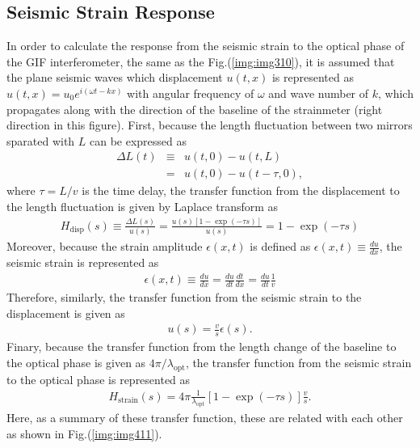 \subsection{Seismic Strain Response}
In order to calculate the response from the seismic strain to the optical phase of the GIF interferometer, the same as the Fig.(\ref{img:img310}), it is assumed that the plane seismic waves which displacement $u(t,x)$ is represented as $u(t,x)=u_0e^{i(\omega{t}-kx)}$ with angular frequency of $\omega$ and wave number of $k$, which propagates along with the direction of the baseline of the strainmeter (right direction in this figure). First, because the length fluctuation between two mirrors sparated with $L$ can be expressed as 
\begin{eqnarray} 
  \Delta{L(t)} &\equiv& u(t,0) - u(t,L) \\
  &=& u(t,0) - u(t-\tau,0), \label{eq:eq403}
\end{eqnarray}
where $\tau=L/v$ is the time delay, the transfer function from the displacement to the length fluctuation is given by Laplace transform as
\begin{eqnarray} \label{eq:eq404}
  H_{\mathrm{disp}}(s) \equiv \frac{\Delta{L(s)}}{u(s)} = \frac{u(s)\left[ 1-\exp(-\tau{s}) \right]}{u(s)} = 1 - \exp(-\tau{s})
\end{eqnarray}
Moreover, because the strain amplitude $\epsilon{(x,t)}$ is defined as $\epsilon{(x,t)}\equiv\frac{du}{dx}$, the seismic strain is represented as 
\begin{eqnarray} 
  \epsilon{(x,t)} \equiv \frac{du}{dx} = \frac{du}{dt} \frac{dt}{dx} =  \frac{du}{dt} \frac{1}{v} \label{eq:eq406}
\end{eqnarray}
Therefore, similarly, the transfer function from the seismic strain to the displacement is given  as
\begin{eqnarray} \label{eq:eq407}
  u(s) = \frac{v}{s} \epsilon(s).
\end{eqnarray}
Finary, because the transfer function from the length change of the baseline to the optical phase is given as $4\pi/{\lambda_{\mathrm{opt}}}$, the transfer function from the seismic strain to the optical phase is represented as 
\begin{eqnarray} \label{eq:eq407}
  H_{\mathrm{strain}}(s) = 4\pi\frac{1}{\lambda_{\mathrm{opt}}} \left[1 - \exp(-\tau{s}) \right]\frac{v}{s}.
\end{eqnarray}
Here, as a summary of these transfer function, these are related with each other as shown in Fig.(\ref{img:img411}). 

